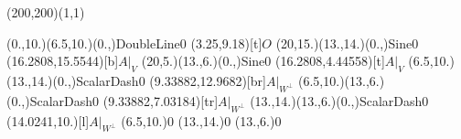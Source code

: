 \unitlength=1bp%

\begin{feynartspicture}(200,200)(1,1)

\FADiagram{}
\FAProp(0.,10.)(6.5,10.)(0.,){DoubleLine}{0}
\FALabel(3.25,9.18)[t]{$O$}
\FAProp(20,15.)(13.,14.)(0.,){Sine}{0}
\FALabel(16.2808,15.5544)[b]{$A|_V$}
\FAProp(20,5.)(13.,6.)(0.,){Sine}{0}
\FALabel(16.2808,4.44558)[t]{$A|_V$}
\FAProp(6.5,10.)(13.,14.)(0.,){ScalarDash}{0}
\FALabel(9.33882,12.9682)[br]{$A|_{W^\perp}$}
\FAProp(6.5,10.)(13.,6.)(0.,){ScalarDash}{0}
\FALabel(9.33882,7.03184)[tr]{$A|_{W^\perp}$}
\FAProp(13.,14.)(13.,6.)(0.,){ScalarDash}{0}
\FALabel(14.0241,10.)[l]{$A|_{W^\perp}$}
\FAVert(6.5,10.){0}
\FAVert(13.,14.){0}
\FAVert(13.,6.){0}
\end{feynartspicture}

